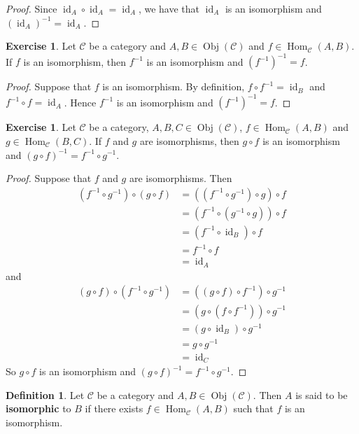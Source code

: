 \documentclass{book}
\theoremstyle{definition}
\newtheorem{defn}[definition]{Definition}
\newtheorem{ex}[definition]{Exercise}
\newcommand{\MC}{\mathcal{C}}
\newcommand{\lex}[1]{\label{ex:#1}}
\newcommand{\ld}[1]{\label{defn:#1}}
\DeclareMathOperator{\id}{id}
\DeclareMathOperator{\Obj}{Obj}
\DeclareMathOperator{\Hom}{Hom}
\DeclareMathOperator*{\0}{\mbf{0}}
\DeclareMathOperator*{\1}{\mbf{1}}
\begin{document}
	\begin{proof}
		Since $\id_A \circ \id_A = \id_A$, we have that $\id_A$ is an isomorphism and $(\id_A)^{-1} = \id_A$.
	\end{proof}
	
	\begin{ex} \lex{15005}
		Let $\MC$ be a category and $A, B \in \Obj(\MC)$ and $f \in \Hom_{\MC}(A,B)$. If $f$ is an isomorphism, then $f^{-1}$ is an isomorphism and $(f^{-1})^{-1} = f$.
	\end{ex}
	
	\begin{proof}
		Suppose that $f$ is an isomorphism. By definition, $f \circ f^{-1} = \id_{B}$ and $f^{-1} \circ f = \id_A$. Hence $f^{-1}$ is an isomorphism and $(f^{-1})^{-1} = f$.
	\end{proof}
	
	\begin{ex} \lex{15006}
		Let $\MC$ be a category, $A,B,C \in \Obj(\MC)$, $f \in \Hom_{\MC}(A, B)$ and $g \in \Hom_{\MC}(B, C)$. If $f$ and $g$ are isomorphisms, then $g \circ f$ is an isomorphism and $(g \circ f)^{-1} = f^{-1} \circ g^{-1}$. 
	\end{ex}
	
	\begin{proof}
		Suppose that $f$ and $g$ are isomorphisms. Then 
		\begin{align*}
			(f^{-1} \circ g^{-1}) \circ (g \circ f) 
			& = ((f^{-1} \circ g^{-1}) \circ g) \circ f \\
			& = (f^{-1} \circ (g^{-1} \circ g)) \circ f \\
			& = (f^{-1} \circ \id_B) \circ f \\
			& = f^{-1} \circ f \\
			& = \id_{A}
		\end{align*}
		and 
		\begin{align*}
			(g \circ f) \circ (f^{-1} \circ g^{-1}) 
			& = ((g \circ f) \circ f^{-1}) \circ g^{-1} \\
			& = (g \circ (f \circ f^{-1})) \circ g^{-1} \\
			& = (g \circ \id_{B}) \circ g^{-1} \\
			& = g \circ  g^{-1} \\
			& = \id_{C}
		\end{align*}
		So $g \circ f$ is an isomorphism and $(g \circ f)^{-1} = f^{-1} \circ g^{-1}$.
	\end{proof}
	
	\begin{defn} \ld{15007}
		Let $\MC$ be a category and $A,B \in \Obj(\MC)$. Then $A$ is said to be \textbf{isomorphic} to $B$ if there exists $f \in \Hom_{\MC}(A, B)$ such that $f$ is an isomorphism. 
	\end{defn}
	
\end{document}
